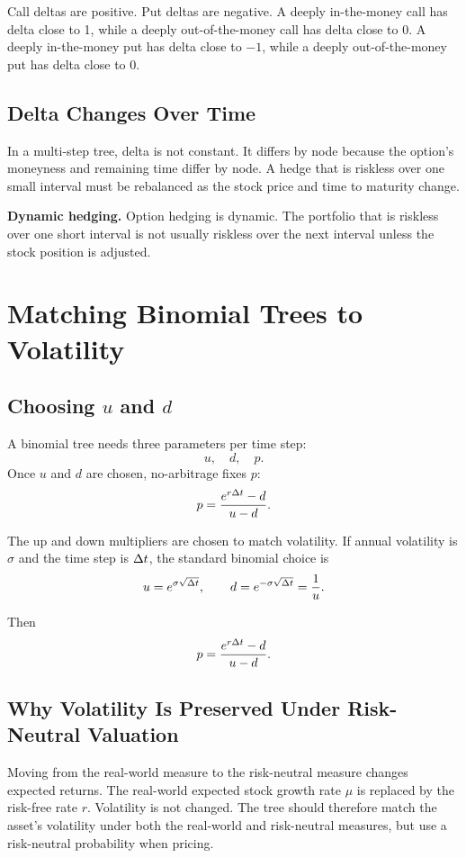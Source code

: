 Call deltas are positive. Put deltas are negative. A deeply in-the-money call
has delta close to 1, while a deeply out-of-the-money call has delta close to 0.
A deeply in-the-money put has delta close to $-1$, while a deeply
out-of-the-money put has delta close to 0.

\subsection{Delta Changes Over Time}

In a multi-step tree, delta is not constant. It differs by node because the
option's moneyness and remaining time differ by node. A hedge that is riskless
over one small interval must be rebalanced as the stock price and time to
maturity change.

\begin{boxF}
\textbf{Dynamic hedging.} Option hedging is dynamic. The portfolio that is
riskless over one short interval is not usually riskless over the next interval
unless the stock position is adjusted.
\end{boxF}

\section{Matching Binomial Trees to Volatility}

\subsection{Choosing $u$ and $d$}

A binomial tree needs three parameters per time step:
\[
    u,\quad d,\quad p.
\]
Once $u$ and $d$ are chosen, no-arbitrage fixes $p$:
\[
    p=\frac{e^{r\Delta t}-d}{u-d}.
\]

The up and down multipliers are chosen to match volatility. If annual volatility
is $\sigma$ and the time step is $\Delta t$, the standard binomial choice is
\[
    u=e^{\sigma\sqrt{\Delta t}},
    \qquad
    d=e^{-\sigma\sqrt{\Delta t}}=\frac{1}{u}.
\]

Then
\[
    p=\frac{e^{r\Delta t}-d}{u-d}.
\]

\subsection{Why Volatility Is Preserved Under Risk-Neutral Valuation}

Moving from the real-world measure to the risk-neutral measure changes expected
returns. The real-world expected stock growth rate $\mu$ is replaced by the
risk-free rate $r$. Volatility is not changed. The tree should therefore match
the asset's volatility under both the real-world and risk-neutral measures, but
use a risk-neutral probability when pricing.

